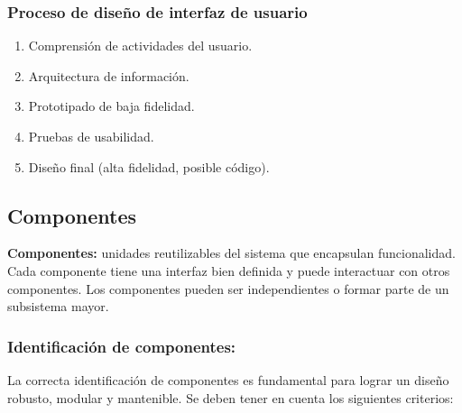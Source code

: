 \subsubsection{Proceso de diseño de interfaz de usuario}

\begin{enumerate}
    \item Comprensión de actividades del usuario.
    \item Arquitectura de información.
    \item Prototipado de baja fidelidad.
    \item Pruebas de usabilidad.
    \item Diseño final (alta fidelidad, posible código).
\end{enumerate}

\subsection{Componentes}\label{subsec:componentes}

\begin{definicion}
    \textbf{Componentes:} unidades reutilizables del sistema que encapsulan funcionalidad.
    Cada componente tiene una interfaz bien definida y puede interactuar con otros componentes.
    Los componentes pueden ser independientes o formar parte de un subsistema mayor.
\end{definicion}

\subsubsection{Identificación de componentes:}


La correcta identificación de componentes es fundamental para lograr un diseño robusto, modular y mantenible.
Se deben tener en cuenta los siguientes criterios:


